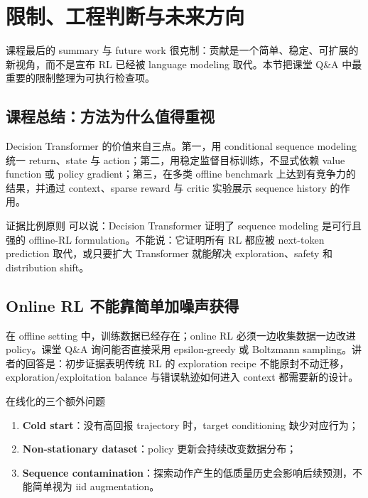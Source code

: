 \section{限制、工程判断与未来方向}

课程最后的 summary 与 future work 很克制：贡献是一个简单、稳定、可扩展的新视角，而不是宣布 RL 已经被 language modeling 取代。本节把课堂 Q\&A 中最重要的限制整理为可执行检查项。

\subsection{课程总结：方法为什么值得重视}

Decision Transformer 的价值来自三点。第一，用 conditional sequence modeling 统一 return、state 与 action；第二，用稳定监督目标训练，不显式依赖 value function 或 policy gradient；第三，在多类 offline benchmark 上达到有竞争力的结果，并通过 context、sparse reward 与 critic 实验展示 sequence history 的作用。


\begin{importantbox}{证据比例原则}
可以说：Decision Transformer 证明了 sequence modeling 是可行且强的 offline-RL formulation。不能说：它证明所有 RL 都应被 next-token prediction 取代，或只要扩大 Transformer 就能解决 exploration、safety 和 distribution shift。
\end{importantbox}

\subsection{Online RL 不能靠简单加噪声获得}

在 offline setting 中，训练数据已经存在；online RL 必须一边收集数据一边改进 policy。课堂 Q\&A 询问能否直接采用 epsilon-greedy 或 Boltzmann sampling。讲者的回答是：初步证据表明传统 RL 的 exploration recipe 不能原封不动迁移，exploration/exploitation balance 与错误轨迹如何进入 context 都需要新的设计。

\begin{warningbox}{在线化的三个额外问题}
\begin{enumerate}
  \item \textbf{Cold start}：没有高回报 trajectory 时，target conditioning 缺少对应行为；
  \item \textbf{Non-stationary dataset}：policy 更新会持续改变数据分布；
  \item \textbf{Sequence contamination}：探索动作产生的低质量历史会影响后续预测，不能简单视为 iid augmentation。
\end{enumerate}
\end{warningbox}

